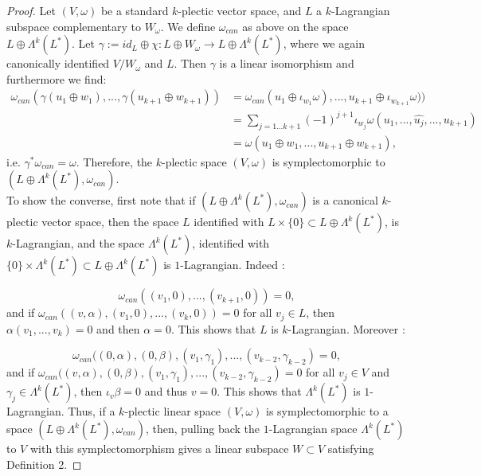\documentclass[a4paper,12pt,leqno]{article}
\begin{document}
\begin{proof}
Let $(V,\omega)$ be a standard $k$-plectic vector space, and $L$ a $k$-Lagrangian subspace complementary to $W_{\omega}$. 
We define $\omega_{can}$ as above on the space $L\oplus \Lambda^k(L^*)$. Let 
$\gamma:=id_L\oplus \chi:L\oplus W_{\omega}\rightarrow L\oplus\Lambda^k(L^{*})$, where we again canonically 
identified  $V/W_{\omega}$
and $L$. Then $\gamma$ is a linear isomorphism 
and furthermore we find:
\begin{align*}
\omega_{can}(\gamma(u_1\oplus w_1),...,\gamma(u_{k+1}\oplus w_{k+1}))&=\omega_{can}(u_1\oplus \iota_{w_1}\omega),...,u_{k+1}\oplus \iota_{w_{k+1}}\omega)) \\
&= \sum_{j=1...k+1}(-1)^{j+1}\iota_{w_j}\omega(u_1,...,\widehat{u_j},...,u_{k+1}) \\ 
&=\omega(u_1\oplus w_1,...,u_{k+1}\oplus w_{k+1}),
\end{align*}
i.e. $\gamma^*\omega_{can}=\omega$. Therefore, the $k$-plectic space $(V,\omega)$ is symplectomorphic to 
$(L\oplus \Lambda^k(L^*),\omega_{can})$. \\

\noindent To show the converse, first note that if $(L\oplus\Lambda^k(L^*),\omega_{can})$ is 
a canonical $k$-plectic vector space, then the space $L$ identified with $L\times\{0\}\subset L\oplus \Lambda^k(L^*)$, is $k$-Lagrangian, 
and the space $ \Lambda^k(L^*)$, identified with $\{0\}\times \Lambda^k(L^*)\subset L\oplus \Lambda^k(L^*)$ is $1$-Lagrangian. Indeed :

\begin{equation*}
\omega_{can}((v_1,0),...,(v_{k+1},0))=0,
\end{equation*}
and if $\omega_{can}((v,\alpha),(v_1,0),...,(v_k,0))=0$ for all $v_j\in L$, then $\alpha(v_1,...,v_k)=0$ and then $\alpha=0$. 
This shows that $L$ is $k$-Lagrangian. Moreover :

\begin{equation*}
\omega_{can}((0,\alpha),(0,\beta),(v_1,\gamma_1),...,(v_{k-2},\gamma_{k-2})=0,
\end{equation*}
and if $\omega_{can}((v,\alpha),(0,\beta),(v_1,\gamma_1),...,(v_{k-2},\gamma_{k-2})=0$ for all $v_j\in V$ and $\gamma_j\in\Lambda^k(L^*)$, then $\iota_v\beta=0$ and thus $v=0$. This shows that $\Lambda^k(L^*)$ is $1$-Lagrangian. Thus, if a $k$-plectic linear space $(V,\omega)$ is symplectomorphic to a space $(L\oplus\Lambda^k(L^*),\omega_{can})$, then, pulling back the $1$-Lagrangian space $\Lambda^k(L^*)$ to $V$ with this symplectomorphism gives a linear subspace $W\subset V$ satisfying Definition 2.
\end{proof}
\end{document}
